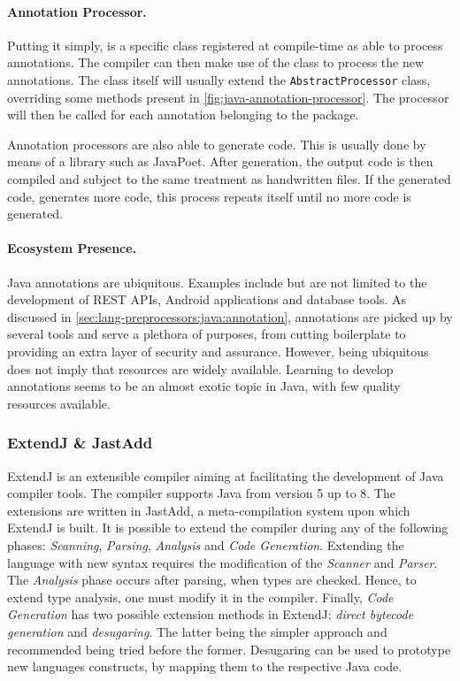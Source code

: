 \paragraph{Annotation Processor.}
Putting it simply, is a specific class registered at compile-time as able to process annotations.
The compiler can then make use of the class to process the new annotations.
The class itself will usually extend the \texttt{AbstractProcessor} class,
overriding some methods present in \autoref{fig:java-annotation-processor}.
The processor will then be called for each annotation belonging to the package.

Annotation processors are also able to generate code.
This is usually done by means of a library such as JavaPoet.
After generation, the output code is then compiled and subject to the same treatment as handwritten files.
If the generated code, generates more code, this process repeats itself until no more code is generated.

\paragraph{Ecosystem Presence.}
Java annotations are ubiquitous.
Examples include but are not limited to the development of REST \gls{API}s,
Android applications and database tools.
As discussed in \autoref{sec:lang-preprocessors:java:annotation},
annotations are picked up by several tools and serve a plethora of purposes,
from cutting boilerplate to providing an extra layer of security and assurance.
However, being ubiquitous does not imply that resources are widely available.
Learning to develop annotations seems to be an almost exotic topic in Java,
with few quality resources available.

\subsubsection*{ExtendJ \& JastAdd}\label{sec:lang-preprocessors:java:extendj}

ExtendJ is an extensible compiler aiming at facilitating the development of Java compiler tools.
The compiler supports Java from version 5 up to 8.
The extensions are written in JastAdd, a meta-compilation system upon which ExtendJ is built.
It is possible to extend the compiler during any of the following phases: \emph{Scanning}, \emph{Parsing}, \emph{Analysis} and \emph{Code Generation}.
Extending the language with new syntax requires the modification of the \emph{Scanner} and \emph{Parser}.
The \emph{Analysis} phase occurs after parsing, when types are checked.
Hence, to extend type analysis, one must modify it in the compiler.
Finally, \emph{Code Generation} has two possible extension methods in ExtendJ:
\emph{direct bytecode generation} and \emph{desugaring}.
The latter being the simpler approach and recommended being tried before the former.
Desugaring can be used to prototype new languages constructs, by mapping them to the respective Java code.

